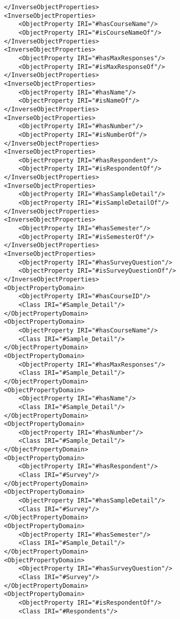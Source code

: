 \begin{lstlisting}
    </InverseObjectProperties>
    <InverseObjectProperties>
        <ObjectProperty IRI="#hasCourseName"/>
        <ObjectProperty IRI="#isCourseNameOf"/>
    </InverseObjectProperties>
    <InverseObjectProperties>
        <ObjectProperty IRI="#hasMaxResponses"/>
        <ObjectProperty IRI="#isMaxResponseOf"/>
    </InverseObjectProperties>
    <InverseObjectProperties>
        <ObjectProperty IRI="#hasName"/>
        <ObjectProperty IRI="#isNameOf"/>
    </InverseObjectProperties>
    <InverseObjectProperties>
        <ObjectProperty IRI="#hasNumber"/>
        <ObjectProperty IRI="#isNumberOf"/>
    </InverseObjectProperties>
    <InverseObjectProperties>
        <ObjectProperty IRI="#hasRespondent"/>
        <ObjectProperty IRI="#isRespondentOf"/>
    </InverseObjectProperties>
    <InverseObjectProperties>
        <ObjectProperty IRI="#hasSampleDetail"/>
        <ObjectProperty IRI="#isSampleDetailOf"/>
    </InverseObjectProperties>
    <InverseObjectProperties>
        <ObjectProperty IRI="#hasSemester"/>
        <ObjectProperty IRI="#isSemesterOf"/>
    </InverseObjectProperties>
    <InverseObjectProperties>
        <ObjectProperty IRI="#hasSurveyQuestion"/>
        <ObjectProperty IRI="#isSurveyQuestionOf"/>
    </InverseObjectProperties>
    <ObjectPropertyDomain>
        <ObjectProperty IRI="#hasCourseID"/>
        <Class IRI="#Sample_Detail"/>
    </ObjectPropertyDomain>
    <ObjectPropertyDomain>
        <ObjectProperty IRI="#hasCourseName"/>
        <Class IRI="#Sample_Detail"/>
    </ObjectPropertyDomain>
    <ObjectPropertyDomain>
        <ObjectProperty IRI="#hasMaxResponses"/>
        <Class IRI="#Sample_Detail"/>
    </ObjectPropertyDomain>
    <ObjectPropertyDomain>
        <ObjectProperty IRI="#hasName"/>
        <Class IRI="#Sample_Detail"/>
    </ObjectPropertyDomain>
    <ObjectPropertyDomain>
        <ObjectProperty IRI="#hasNumber"/>
        <Class IRI="#Sample_Detail"/>
    </ObjectPropertyDomain>
    <ObjectPropertyDomain>
        <ObjectProperty IRI="#hasRespondent"/>
        <Class IRI="#Survey"/>
    </ObjectPropertyDomain>
    <ObjectPropertyDomain>
        <ObjectProperty IRI="#hasSampleDetail"/>
        <Class IRI="#Survey"/>
    </ObjectPropertyDomain>
    <ObjectPropertyDomain>
        <ObjectProperty IRI="#hasSemester"/>
        <Class IRI="#Sample_Detail"/>
    </ObjectPropertyDomain>
    <ObjectPropertyDomain>
        <ObjectProperty IRI="#hasSurveyQuestion"/>
        <Class IRI="#Survey"/>
    </ObjectPropertyDomain>
    <ObjectPropertyDomain>
        <ObjectProperty IRI="#isRespondentOf"/>
        <Class IRI="#Respondents"/>

\end{lstlisting}

